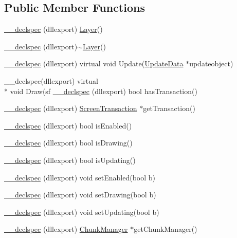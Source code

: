 \subsection*{Public Member Functions}
\begin{DoxyCompactItemize}
\item 
\hyperlink{class_layer_aef82e8c88a73de071f2951744dd5fbc7}{\-\_\-\-\_\-declspec} (dllexport) \hyperlink{class_layer}{Layer}()
\item 
\hyperlink{class_layer_ae17eacb9709778961a8f044834963c92}{\-\_\-\-\_\-declspec} (dllexport)$\sim$\hyperlink{class_layer}{Layer}()
\item 
\hyperlink{class_layer_aa53cd45edd1551626f7a9349e368e445}{\-\_\-\-\_\-declspec} (dllexport) virtual void Update(\hyperlink{class_update_data}{Update\-Data} $\ast$updateobject)
\item 
\-\_\-\-\_\-declspec(dllexport) virtual \\*
void Draw(sf \hyperlink{class_layer_acb6a84b41682f21a857dfd9fdf401c05}{\-\_\-\-\_\-declspec} (dllexport) bool has\-Transaction()
\item 
\hyperlink{class_layer_aa5da63da0e6aa4ba5d401dfacda98204}{\-\_\-\-\_\-declspec} (dllexport) \hyperlink{class_screen_transaction}{Screen\-Transaction} $\ast$get\-Transaction()
\item 
\hyperlink{class_layer_a7b16aa0abac81bb0abfed937c02374cf}{\-\_\-\-\_\-declspec} (dllexport) bool is\-Enabled()
\item 
\hyperlink{class_layer_adf8adf7a53cb647e84d749379930d897}{\-\_\-\-\_\-declspec} (dllexport) bool is\-Drawing()
\item 
\hyperlink{class_layer_a4b55bc3ac94c62d356bfc30f08382d6b}{\-\_\-\-\_\-declspec} (dllexport) bool is\-Updating()
\item 
\hyperlink{class_layer_aabba8310bc18ddf8488cd5685baab5e7}{\-\_\-\-\_\-declspec} (dllexport) void set\-Enabled(bool b)
\item 
\hyperlink{class_layer_a5065c5c2027ec45a40870adca41522fc}{\-\_\-\-\_\-declspec} (dllexport) void set\-Drawing(bool b)
\item 
\hyperlink{class_layer_a17a99eb35b1d1780c45acd3af6e4ffa2}{\-\_\-\-\_\-declspec} (dllexport) void set\-Updating(bool b)
\item 
\hyperlink{class_layer_a7fe1685bbc80b73fe42a2cc0c58a272d}{\-\_\-\-\_\-declspec} (dllexport) \hyperlink{class_chunk_manager}{Chunk\-Manager} $\ast$get\-Chunk\-Manager()
\end{DoxyCompactItemize}
